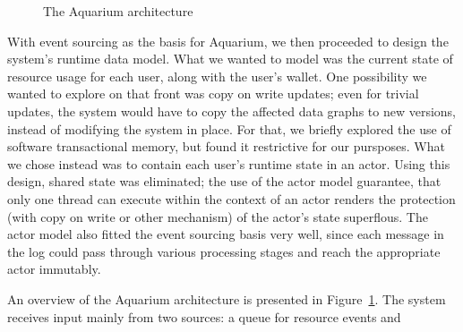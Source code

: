 \begin{figure}

\caption{The Aquarium architecture} 
\label{fig:arch}
\end{figure}

With event sourcing as the basis for Aquarium, we then proceeded to design the
system's runtime data model. What we wanted to model was the current state of
resource usage for each user, along with the user's wallet. One possibility we
wanted to explore on that front was copy on write updates; even for trivial
updates, the system would have to copy the affected data graphs to new
versions, instead of modifying the system in place. For that, we briefly
explored the use of software transactional memory, but found it restrictive for
our pursposes. What we chose instead was to contain each user's runtime state
in an actor. Using this design, shared state was eliminated; the use of the
actor model guarantee, that only one thread can execute within the context of
an actor renders the protection (with copy on write or other mechanism) of the
actor's state superflous. The actor model also fitted the event sourcing basis
very well, since each message in the log could pass through various processing
stages and reach the appropriate actor immutably.

An overview of the Aquarium architecture is presented in 
Figure~\ref{fig:arch}. The system receives input mainly from two sources:
a queue for resource events and 

